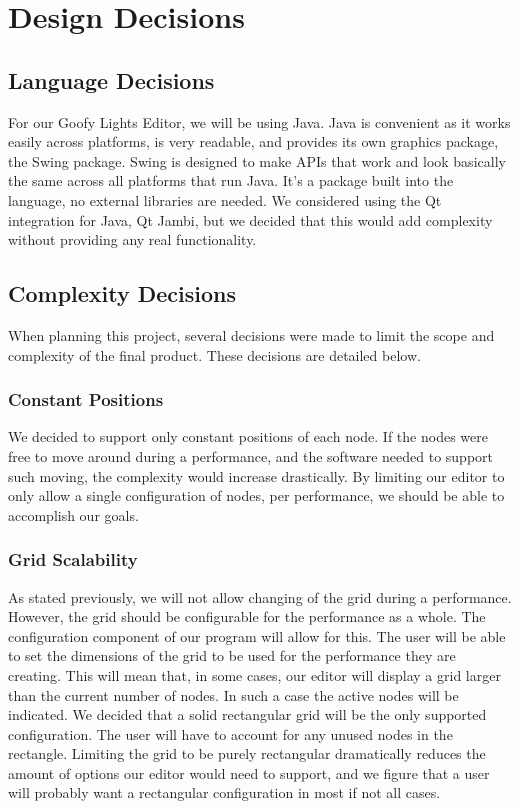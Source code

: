 \documentclass[letterpaper,12pt]{article}
\begin{document}
	\section*{Design Decisions}
	\subsection*{Language Decisions}
For our Goofy Lights Editor, we will be using Java. Java is convenient as it works easily across platforms, is very readable, and provides its own graphics package, the Swing package. Swing is designed to make APIs that work and look basically the same across all platforms that run Java. It's a package built into the language, no external libraries are needed. We considered using the Qt integration for Java, Qt Jambi, but we decided that this would add complexity without providing any real functionality. 
		
	\subsection*{Complexity Decisions}
When planning this project, several decisions were made to limit the scope and complexity of the final product. These decisions are detailed below. 
	\subsubsection*{Constant Positions}
We decided to support only constant positions of each node. If the nodes were free to move around during a performance, and the software needed to support such moving, the complexity would increase drastically. By limiting our editor to only allow a single configuration of nodes, per performance, we should be able to accomplish our goals. 
	\subsubsection*{Grid Scalability}
As stated previously, we will not allow changing of the grid during a performance. However, the grid should be configurable for the performance as a whole. The configuration component of our program will allow for this. The user will be able to set the dimensions of the grid to be used for the performance they are creating. This will mean that, in some cases, our editor will display a grid larger than the current number of nodes. In such a case the active nodes will be indicated. We decided that a solid rectangular grid will be the only supported configuration. The user will have to account for any unused nodes in the rectangle. Limiting the grid to be purely rectangular dramatically reduces the amount of options our editor would need to support, and we figure that a user will probably want a rectangular configuration in most if not all cases.
\pagebreak[4]
\end{document}
